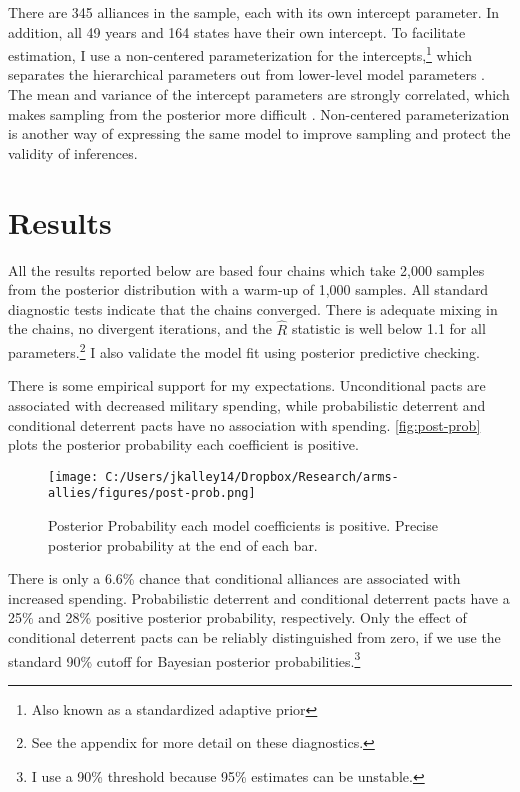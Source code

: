 \documentclass[12pt]{article}
\begin{document}
There are 345 alliances in the sample, each with its own intercept parameter. In addition, all 49 years and 164 states have their own intercept. To facilitate estimation, I use a non-centered parameterization for the intercepts,\footnote{Also known as a standardized adaptive prior} which separates the hierarchical parameters out from lower-level model parameters \citep{McElreath2016}. The mean and variance of the intercept parameters are strongly correlated, which makes sampling from the posterior more difficult \citep{BetancourtGirolani2015}. Non-centered parameterization is another way of expressing the same model to improve sampling and protect the validity of inferences. 


\section*{Results} 

All the results reported below are based four chains which take 2,000 samples from the posterior distribution with a warm-up of 1,000 samples. All standard diagnostic tests indicate that the chains converged. There is adequate mixing in the chains, no divergent iterations, and the $\hat{R}$ statistic is well below 1.1 for all parameters.\footnote{See the appendix for more detail on these diagnostics.} I also validate the model fit using posterior predictive checking. 

There is some empirical support for my expectations. Unconditional pacts are associated with decreased military spending, while probabilistic deterrent and conditional deterrent pacts have no association with spending. \autoref{fig:post-prob} plots the posterior probability each coefficient is positive. 

\begin{figure}[htbp]
	\centering
  \texttt{[image: C:/Users/jkalley14/Dropbox/Research/arms-allies/figures/post-prob.png]}
	\caption{Posterior Probability each model coefficients is positive. Precise posterior probability at the end of each bar.}
	\label{fig:post-prob}
\end{figure}


There is only a 6.6\% chance that conditional alliances are associated with increased spending. Probabilistic deterrent and conditional deterrent pacts have a 25\% and 28\% positive posterior probability, respectively. Only the effect of conditional deterrent pacts can be reliably distinguished from zero, if we use the standard 90\% cutoff for Bayesian posterior probabilities.\footnote{I use a 90\% threshold because 95\% estimates can be unstable.}
\end{document}
